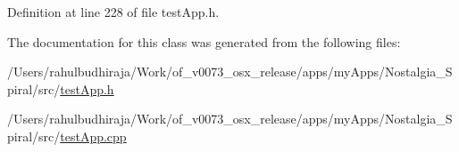 Definition at line 228 of file test\-App.\-h.



The documentation for this class was generated from the following files\-:\begin{DoxyCompactItemize}
\item 
/\-Users/rahulbudhiraja/\-Work/of\-\_\-v0073\-\_\-osx\-\_\-release/apps/my\-Apps/\-Nostalgia\-\_\-\-Spiral/src/\hyperlink{test_app_8h}{test\-App.\-h}\item 
/\-Users/rahulbudhiraja/\-Work/of\-\_\-v0073\-\_\-osx\-\_\-release/apps/my\-Apps/\-Nostalgia\-\_\-\-Spiral/src/\hyperlink{test_app_8cpp}{test\-App.\-cpp}\end{DoxyCompactItemize}
